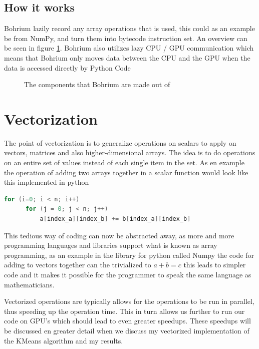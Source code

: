 \documentclass[12pt]{report}
\begin{document}
\subsection{How it works}
\label{subsec:hiw}
Bohrium lazily record any array operations that is used, this could as an example be from NumPy, and turn them into bytecode instruction set. An overview can be seen in figure \ref{fig:bohrium_overview}. Bohrium also utilizes lazy CPU / GPU communication which means that Bohrium only moves data between the CPU and the GPU when the data is accessed directly by Python Code \cite{bohrium_website}

\begin{figure}[H]
  \centering
  
\caption{\label{fig:bohrium_overview}The components that Bohrium are made out of}
\end{figure}



\section{Vectorization}
\label{subsec:vectorization}

The point of vectorization is to generalize operations on scalars to apply on vectors, matrices and also higher-dimensional arrays. The idea is to do operations on an entire set of values instead of each single item in the set. As en example the operation of adding two arrays together in a scalar function would look like this implemented in python
\begin{lstlisting}[language=C]
  for (i=0; i < n; i++)
      for (j = 0; j < n; j++)
          a[index_a][index_b] += b[index_a][index_b]
\end{lstlisting}

This tedious way of coding can now be abstracted away, as more and more programming languages and libraries support what is known as array programming, as an example in the library for python called Numpy the code for adding to vectors together can the trivialized to $a + b = c$ this leads to simpler code and it makes it possible for the programmer to speak the same language as mathematicians.

Vectorized operations are typically allows for the operations to be run in parallel, thus speeding up the operation time. This in turn allows us further to run our code on GPU's which should lead to even greater speedups. These speedups will be discussed en greater detail when we discuss my vectorized implementation of the KMeans algorithm and my results.
\end{document}
